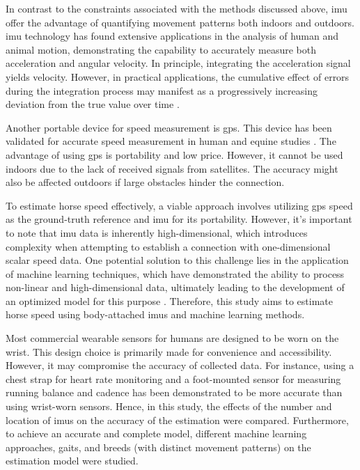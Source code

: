 In contrast to the constraints associated with the methods discussed above, \gls{imu} offer the advantage of quantifying movement patterns both indoors and outdoors. \gls{imu} technology has found extensive applications in the analysis of human and animal motion, demonstrating the capability to accurately measure both acceleration and angular velocity. In principle, integrating the acceleration signal yields velocity. However, in practical applications, the cumulative effect of errors during the integration process may manifest as a progressively increasing deviation from the true value over time \cite{Fasel2017,Feigl2020,Brzostowski2018,Diez2018}.

Another portable device for speed measurement is \gls{gps}. This device has been validated for accurate speed measurement \cite{witte_2004_accuracy,varley_2012_validity,borresen_2009_the,roe_2017_validity,beato_2018_validity} in human \cite{scott_2016_the} and equine studies \cite{kingston_2006_use,bazzano_2016_application,farries_2019_analysis,fonseca_2010_the,parkes_2019_the,vermeulen_2006_measurements,williams_2019_the,han_2020_selection,best_2019_the}. The advantage of using \gls{gps} is portability and low price. However, it cannot be used indoors due to the lack of received signals from satellites. The accuracy might also be affected outdoors if large obstacles hinder the connection. 

To estimate horse speed effectively, a viable approach involves utilizing \gls{gps} speed as the ground-truth reference and \gls{imu} for its portability. However, it's important to note that \gls{imu} data is inherently high-dimensional, which introduces complexity when attempting to establish a connection with one-dimensional scalar speed data. One potential solution to this challenge lies in the application of machine learning techniques, which have demonstrated the ability to process non-linear and high-dimensional data, ultimately leading to the development of an optimized model for this purpose \cite{phinyomark2018analysis}. Therefore, this study aims to estimate horse speed using body-attached \gls{imu}s and machine learning methods. 

Most commercial wearable sensors for humans are designed to be worn on the wrist. This design choice is primarily made for convenience and accessibility. However, it may compromise the accuracy of collected data. For instance, using a chest strap for heart rate monitoring and a foot-mounted sensor for measuring running balance and cadence has been demonstrated to be more accurate than using wrist-worn sensors. Hence, in this study, the effects of the number and location of \gls{imu}s on the accuracy of the estimation were compared. Furthermore, to achieve an accurate and complete model, different machine learning approaches, gaits, and breeds (with distinct movement patterns) on the estimation model were studied.